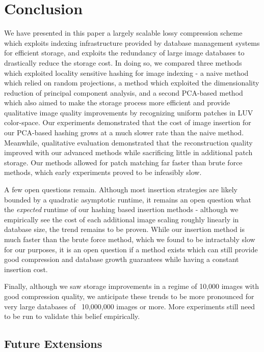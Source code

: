 \section{Conclusion}\label{sec:conclusion}

We have presented in this paper a largely scalable lossy compression scheme which exploits indexing infrastructure provided by database management systems for efficient storage, and exploits the redundancy of large image databases to drastically reduce the storage cost.  In doing so, we compared three methods which exploited locality sensitive hashing for image indexing - a naive method which relied on random projections, a method which exploited the dimensionality reduction of principal component analysis, and a second PCA-based method which also aimed to make the storage process more efficient and provide qualitative image quality improvements by recognizing uniform patches in LUV color-space.  Our experiments demonstrated that the cost of image insertion for our PCA-based hashing grows at a much slower rate than the naive method.  Meanwhile, qualitative evaluation demonstrated that the reconstruction quality improved with our advanced methods while sacrificing little in additional patch storage.  Our methods allowed for patch matching far faster than brute force methods, which early experiments proved to be infeasibly slow.

A few open questions remain.  Although most insertion strategies are likely bounded by a quadratic asymptotic runtime, it remains an open question what the \emph{expected} runtime of our hashing based insertion methods - although we empirically see the cost of each additional image scaling roughly linearly in database size, the trend remains to be proven.  While our insertion method is much faster than the brute force method, which we found to be intractably slow for our purposes,  it is an open question if a method exists which can still provide good compression and database growth guarantees while having a constant insertion cost.

Finally, although we saw storage improvements in a regime of 10,000 images with good compression quality, we anticipate these trends to be more pronounced for very large databases of ~10,000,000 images or more. More experiments still need to be run to validate this belief empirically.




\subsection{Future Extensions}
\label{sec:futureext}

